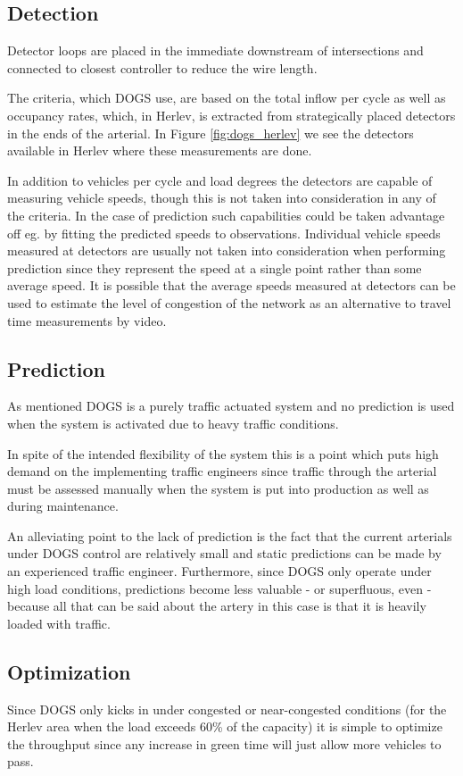 \subsection{Detection}
Detector loops are placed in the immediate downstream of intersections and connected to closest controller to reduce the wire length. 

The criteria, which DOGS use, are based on the total inflow per cycle as well as occupancy rates, which, in Herlev, is extracted from strategically placed detectors in the ends of the arterial. In Figure \ref{fig:dogs_herlev} we see the detectors available in Herlev where these measurements are done. 

In addition to vehicles per cycle and load degrees the detectors are capable of measuring vehicle speeds, though this is not taken into consideration in any of the criteria. In the case of prediction such capabilities could be taken advantage off eg. by fitting the predicted speeds to observations.
Individual vehicle speeds measured at detectors are usually not taken into consideration when performing prediction since they represent the speed at a single point rather than some average speed. It is possible that the average speeds measured at detectors can be used to estimate the level of congestion of the network as an alternative to travel time measurements by video.

\subsection{Prediction}
As mentioned DOGS is a purely traffic actuated system and no prediction is used when the system is activated due to heavy traffic conditions.

In spite of the intended flexibility of the system this is a point which puts high demand on the implementing traffic engineers since traffic through the arterial must be assessed manually when the system is put into production as well as during maintenance.

An alleviating point to the lack of prediction is the fact that the current arterials under DOGS control are relatively small and static predictions can be made by an experienced traffic engineer. Furthermore, since DOGS only operate under high load conditions, predictions become less valuable - or superfluous, even - because all that can be said about the artery in this case is that it is heavily loaded with traffic.

\subsection{Optimization}
Since DOGS only kicks in under congested or near-congested conditions (for the Herlev area when the load exceeds 60\% of the capacity) it is simple to optimize the throughput since any increase in green time will just allow more vehicles to pass.

